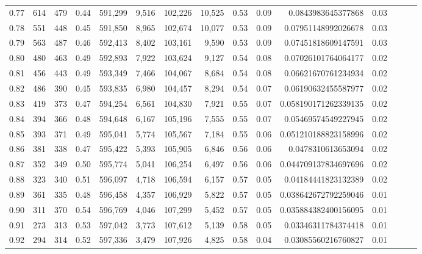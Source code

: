 \begin{tabular}{rrrrrrrrrrrrrrr}
0.77 &     614 &    479 &  0.44 &  591,299 &    9,516 &  102,226 &   10,525 &  0.53 &  0.09 &    0.0843983645377868 &      0.03 \\
0.78 &     551 &    448 &  0.45 &  591,850 &    8,965 &  102,674 &   10,077 &  0.53 &  0.09 &   0.07951148992026678 &      0.03 \\
0.79 &     563 &    487 &  0.46 &  592,413 &    8,402 &  103,161 &    9,590 &  0.53 &  0.09 &   0.07451818609147591 &      0.03 \\
0.80 &     480 &    463 &  0.49 &  592,893 &    7,922 &  103,624 &    9,127 &  0.54 &  0.08 &   0.07026101764064177 &      0.02 \\
0.81 &     456 &    443 &  0.49 &  593,349 &    7,466 &  104,067 &    8,684 &  0.54 &  0.08 &   0.06621670761234934 &      0.02 \\
0.82 &     486 &    390 &  0.45 &  593,835 &    6,980 &  104,457 &    8,294 &  0.54 &  0.07 &   0.06190632455587977 &      0.02 \\
0.83 &     419 &    373 &  0.47 &  594,254 &    6,561 &  104,830 &    7,921 &  0.55 &  0.07 &  0.058190171262339135 &      0.02 \\
0.84 &     394 &    366 &  0.48 &  594,648 &    6,167 &  105,196 &    7,555 &  0.55 &  0.07 &   0.05469574549227945 &      0.02 \\
0.85 &     393 &    371 &  0.49 &  595,041 &    5,774 &  105,567 &    7,184 &  0.55 &  0.06 &  0.051210188823158996 &      0.02 \\
0.86 &     381 &    338 &  0.47 &  595,422 &    5,393 &  105,905 &    6,846 &  0.56 &  0.06 &    0.0478310613653094 &      0.02 \\
0.87 &     352 &    349 &  0.50 &  595,774 &    5,041 &  106,254 &    6,497 &  0.56 &  0.06 &  0.044709137834697696 &      0.02 \\
0.88 &     323 &    340 &  0.51 &  596,097 &    4,718 &  106,594 &    6,157 &  0.57 &  0.05 &   0.04184441823132389 &      0.02 \\
0.89 &     361 &    335 &  0.48 &  596,458 &    4,357 &  106,929 &    5,822 &  0.57 &  0.05 &  0.038642672792259046 &      0.01 \\
0.90 &     311 &    370 &  0.54 &  596,769 &    4,046 &  107,299 &    5,452 &  0.57 &  0.05 &  0.035884382400156095 &      0.01 \\
0.91 &     273 &    313 &  0.53 &  597,042 &    3,773 &  107,612 &    5,139 &  0.58 &  0.05 &   0.03346311784374418 &      0.01 \\
0.92 &     294 &    314 &  0.52 &  597,336 &    3,479 &  107,926 &    4,825 &  0.58 &  0.04 &   0.03085560216760827 &      0.01 \\

\end{tabular}
